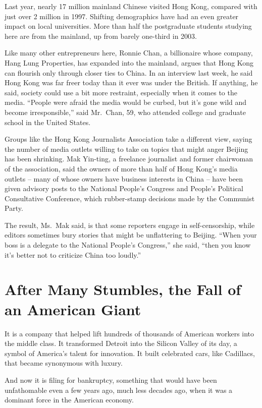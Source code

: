 \documentclass[12pt,a4paper,onecolumn]{article}
\begin{document}
Last year, nearly 17 million mainland Chinese visited Hong Kong, compared with just over 2 million
in 1997. Shifting demographics have had an even greater impact on local universities. More than half
the postgraduate students studying here are from the mainland, up from barely one-third in 2003.

Like many other entrepreneurs here, Ronnie Chan, a billionaire whose company, Hang Lung Properties,
has expanded into the mainland, argues that Hong Kong can flourish only through closer ties to
China. In an interview last week, he said Hong Kong was far freer today than it ever was under the
British. If anything, he said, society could use a bit more restraint, especially when it comes to
the media. ``People were afraid the media would be curbed, but it's gone wild and become
irresponsible,'' said Mr.~Chan, 59, who attended college and graduate school in the United States.

Groups like the Hong Kong Journalists Association take a different view, saying the number of media
outlets willing to take on topics that might anger Beijing has been shrinking. Mak Yin-ting, a
freelance journalist and former chairwoman of the association, said the owners of more than half of
Hong Kong's media outlets -- many of whose owners have business interests in China -- have been
given advisory posts to the National People's Congress and People's Political Consultative
Conference, which rubber-stamp decisions made by the Communist Party.

The result, Ms.~Mak said, is that some reporters engage in self-censorship, while editors sometimes
bury stories that might be unflattering to Beijing. ``When your boss is a delegate to the National
People's Congress,'' she said, ``then you know it's better not to criticize China too loudly.''

\section{After Many Stumbles, the Fall of an American Giant}

It is a company that helped lift hundreds of thousands of American workers into the middle class. It
transformed Detroit into the Silicon Valley of its day, a symbol of America's talent for innovation.
It built celebrated cars, like Cadillacs, that became synonymous with luxury.

And now it is filing for bankruptcy, something that would have been unfathomable even a few years
ago, much less decades ago, when it was a dominant force in the American economy.
\end{document}

